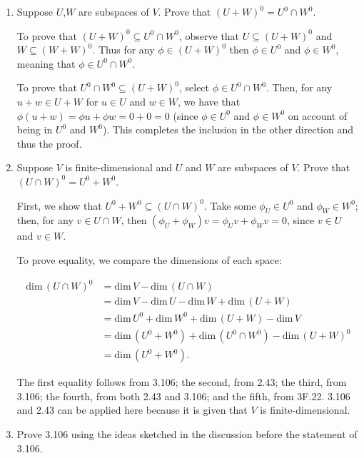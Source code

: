 \documentclass{book}
\begin{document}
\begin{enumerate}
\item Suppose \(U\),\(W\) are subspaces of \(V\).  Prove that \((U + W)^0 = U^0 \cap W^0\).

To prove that \((U + W)^0 \subseteq U^0 \cap W^0\), observe that \(U \subseteq (U+W)^0\) and \(W \subseteq (W+W)^0\).  Thus for any \(\phi \in (U+W)^0\) then \(\phi \in U^0\) and \(\phi \in W^0\), meaning that \(\phi \in U^0 \cap W^0\).

To prove that \(U^0 \cap W^0 \subseteq (U+W)^0\), select \(\phi \in U^0 \cap W^0\).  Then, for any \(u+w \in U+W\) for \(u \in U\) and \(w \in W\), we have that \(\phi(u+w)=\phi u + \phi w=0+0=0\) (since \(\phi \in U^0\) and \(\phi \in W^0\) on account of being in \(U^0\) and \(W^0\)).  This completes the inclusion in the other direction and thus the proof.

\item Suppose \(V\) is finite-dimensional and \(U\) and \(W\) are subspaces of \(V\).  Prove that \((U \cap W)^0 = U^0 + W^0\).

First, we show that \(U^0 + W^0 \subseteq (U \cap W)^0\).  Take some \(\phi_U \in U^0\) and \(\phi_W \in W^0\); then, for any \(v \in U \cap W\), then \((\phi_U+\phi_W)v=\phi_U v + \phi_W v=0\), since \(v \in U\) and \(v \in W\).

To prove equality, we compare the dimensions of each space:

\begin{equation*}
    \begin{split}
        \text{dim} \, (U \cap W)^0 &= \text{dim} \, V - \text{dim} \, (U \cap W) \\
        &= \text{dim} \, V - \text{dim} \, U - \text{dim} \, W + \text{dim} \, (U + W) \\
        &= \text{dim} \, U^0 + \text{dim} \, W^0 + \text{dim} \, (U+W) - \text{dim} \, V \\
        &= \text{dim} \, (U^0+W^0) + \text{dim} \, (U^0 \cap W^0) - \text{dim} \, (U+W)^0 \\
        &= \text{dim} \, (U^0+W^0).
    \end{split}
\end{equation*}

The first equality follows from 3.106; the second, from 2.43; the third, from 3.106; the fourth, from both 2.43 and 3.106; and the fifth, from 3F.22.  3.106 and 2.43 can be applied here because it is given that \(V\) is finite-dimensional.

\item Prove 3.106 using the ideas sketched in the discussion before the statement of 3.106.


\end{enumerate}
\end{document}
